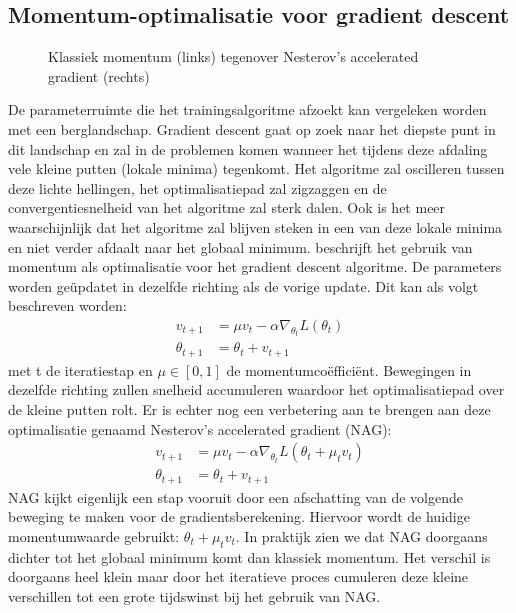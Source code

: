 \subsection{Momentum-optimalisatie voor gradient descent}
\begin{figure}[!t]
	\centering
	\def\svgwidth{0.6\columnwidth}
	
	\caption{Klassiek momentum (links) tegenover Nesterov's accelerated gradient (rechts) \cite{sutskever2013importance}}
	\label{fig:momentum}
\end{figure}
De parameterruimte die het trainingsalgoritme afzoekt kan vergeleken worden met een berglandschap. Gradient descent gaat op zoek naar het diepste punt in dit landschap en zal in de problemen komen wanneer het tijdens deze afdaling vele kleine putten (lokale minima) tegenkomt. Het algoritme zal oscilleren tussen deze lichte hellingen, het optimalisatiepad zal zigzaggen en de convergentiesnelheid van het algoritme zal sterk dalen. Ook is het meer waarschijnlijk dat het algoritme zal blijven steken in een van deze lokale minima en niet verder afdaalt naar het globaal minimum.
\npar \cite{botev_nesterovs_2016} beschrijft het gebruik van momentum als optimalisatie voor het gradient descent algoritme. De parameters worden ge\"updatet in dezelfde richting als de vorige update. Dit kan als volgt beschreven worden:
\begin{equation}
\begin{aligned}
v_{t+1} &= \mu v_{t} - \alpha\nabla_{\theta_t} L(\theta_{t})\\
\theta_{t+1} &= \theta_t + v_{t+1}
\end{aligned}
\end{equation}
met t de iteratiestap en $\mu \in[0,1]$ de momentumco\"effici\"ent. Bewegingen in dezelfde richting zullen snelheid accumuleren waardoor het optimalisatiepad over de kleine putten rolt. Er is echter nog een verbetering aan te brengen aan deze optimalisatie genaamd Nesterov's accelerated gradient (NAG):
\begin{equation}
\begin{aligned}
v_{t+1} &= \mu v_t - \alpha\nabla_{\theta_t} L(\theta_{t}+\mu_tv_t)\\
\theta_{t+1} &= \theta_t + v_{t+1}
\end{aligned}
\end{equation}
\npar NAG kijkt eigenlijk een stap vooruit door een afschatting van de volgende beweging te maken voor de gradientsberekening. Hiervoor wordt de huidige momentumwaarde gebruikt: $\theta_{t}+\mu_tv_t$.  In praktijk zien we dat NAG doorgaans dichter tot het globaal minimum komt dan klassiek momentum. Het verschil is doorgaans heel klein maar door het iteratieve proces cumuleren deze kleine verschillen tot een grote tijdswinst bij het gebruik van NAG.

